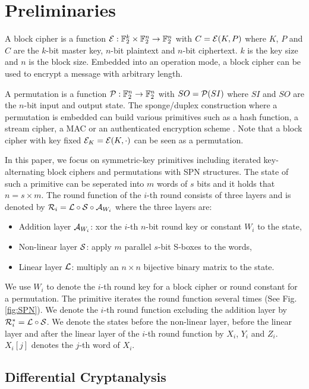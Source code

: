 \section{Preliminaries\label{sec:pre}}

A block cipher is a function $\mathcal{E}:\mathbb{F}_2^k \times \mathbb{F}_2^n \rightarrow \mathbb{F}_2^n$ with $C=\mathcal{E}(K,P)$ where $K$, $P$ and $C$ are the $k$-bit master key, $n$-bit plaintext and $n$-bit ciphertext. $k$ is the key size and $n$ is the block size. Embedded into an operation mode, a block cipher can be used to encrypt a message with arbitrary length. 

A permutation is a function $\mathcal{P}:\mathbb{F}_2^n \rightarrow \mathbb{F}_2^n$ with $SO=\mathcal{P}(SI)$ where $SI$ and $SO$ are the $n$-bit input and output state. The sponge/duplex construction where a permutation is embedded can build various primitives such as a hash function, a stream cipher, a MAC or an authenticated encryption scheme \cite{bertoni2007sponge}. Note that a block cipher with key fixed $\mathcal{E}_K=\mathcal{E}(K,\cdot)$ can be seen as a permutation.

In this paper, we focus on symmetric-key primitives including iterated key-alternating block ciphers and permutations with SPN structures. The state of such a primitive can be seperated into $m$ words of $s$ bits and it holds that $n=s\times m$. The round function of the $i$-th round consists of three layers and is denoted by $\mathcal{R}_i=\mathcal{L}\circ\mathcal{S}\circ\mathcal{A}_{W_i}$ where the three layers are:
\begin{itemize}
    \item Addition layer $\mathcal{A}_{W_i}$: xor the $i$-th $n$-bit round key or constant $W_i$ to the state,
    \item Non-linear layer $\mathcal{S}$: apply $m$ parallel $s$-bit S-boxes to the words,
    \item Linear layer $\mathcal{L}$: multiply an $n\times n$ bijective binary matrix to the state. 
\end{itemize}

We use $W_i$ to denote the $i$-th round key for a block cipher or round constant for a permutation. The primitive iterates the round function several times (See Fig. \ref{fig:SPN}). We denote the $i$-th round function excluding the addition layer by $\mathcal{R}_i^*=\mathcal{L}\circ\mathcal{S}$. We denote the states before the non-linear layer, before the linear layer and after the linear layer of the $i$-th round function by $X_i$, $Y_i$ and $Z_i$. $X_i[j]$ denotes the $j$-th word of $X_i$. 

\subsection{Differential Cryptanalysis}

